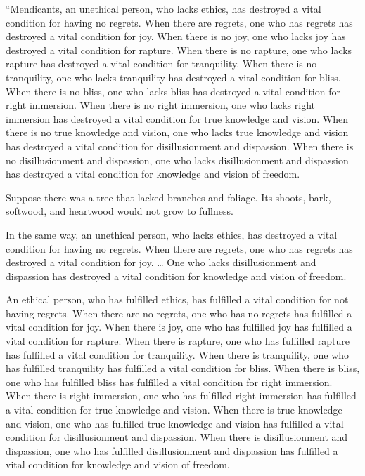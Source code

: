 \documentclass[12pt,openany]{book}%
\begin{document}
“Mendicants, an unethical person, who lacks ethics, has destroyed a vital condition for having no regrets. When there are regrets, one who has regrets has destroyed a vital condition for joy. When there is no joy, one who lacks joy has destroyed a vital condition for rapture. When there is no rapture, one who lacks rapture has destroyed a vital condition for tranquility. When there is no tranquility, one who lacks tranquility has destroyed a vital condition for bliss. When there is no bliss, one who lacks bliss has destroyed a vital condition for right immersion. When there is no right immersion, one who lacks right immersion has destroyed a vital condition for true knowledge and vision. When there is no true knowledge and vision, one who lacks true knowledge and vision has destroyed a vital condition for disillusionment and dispassion. When there is no disillusionment and dispassion, one who lacks disillusionment and dispassion has destroyed a vital condition for knowledge and vision of freedom. 

Suppose there was a tree that lacked branches and foliage. Its shoots, bark, softwood, and heartwood would not grow to fullness. 

In the same way, an unethical person, who lacks ethics, has destroyed a vital condition for having no regrets. When there are regrets, one who has regrets has destroyed a vital condition for joy. … One who lacks disillusionment and dispassion has destroyed a vital condition for knowledge and vision of freedom. 

An ethical person, who has fulfilled ethics, has fulfilled a vital condition for not having regrets. When there are no regrets, one who has no regrets has fulfilled a vital condition for joy. When there is joy, one who has fulfilled joy has fulfilled a vital condition for rapture. When there is rapture, one who has fulfilled rapture has fulfilled a vital condition for tranquility. When there is tranquility, one who has fulfilled tranquility has fulfilled a vital condition for bliss. When there is bliss, one who has fulfilled bliss has fulfilled a vital condition for right immersion. When there is right immersion, one who has fulfilled right immersion has fulfilled a vital condition for true knowledge and vision. When there is true knowledge and vision, one who has fulfilled true knowledge and vision has fulfilled a vital condition for disillusionment and dispassion. When there is disillusionment and dispassion, one who has fulfilled disillusionment and dispassion has fulfilled a vital condition for knowledge and vision of freedom. 
\end{document}
